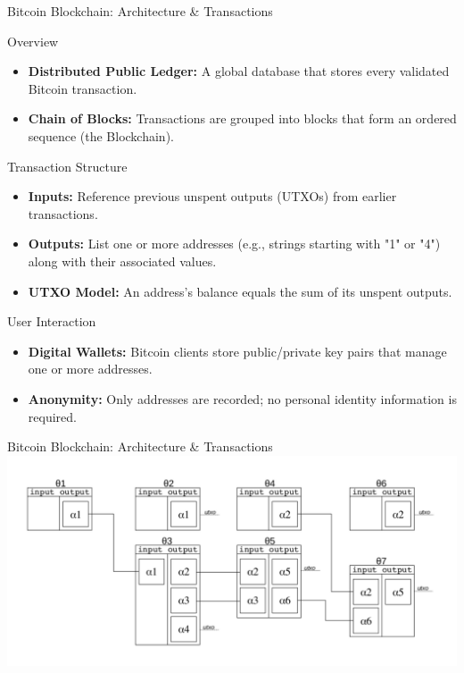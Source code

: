 \documentclass{beamer}
\begin{document}
\begin{frame}{Bitcoin Blockchain: Architecture \& Transactions}
    \footnotesize
    \vspace{-0.2cm}
    \begin{block}{Overview}
        \begin{itemize}
            \item \textbf{Distributed Public Ledger:} A global database that stores every validated Bitcoin transaction.
            \item \textbf{Chain of Blocks:} Transactions are grouped into blocks that form an ordered sequence (the Blockchain).
        \end{itemize}
    \end{block}

    \vspace{-0.2cm}
    \begin{block}{Transaction Structure}
        \begin{itemize}
            \item \textbf{Inputs:} Reference previous unspent outputs (UTXOs) from earlier transactions.
            \item \textbf{Outputs:} List one or more addresses (e.g., strings starting with "1" or "4") along with their associated values.
            \item \textbf{UTXO Model:} An address's balance equals the sum of its unspent outputs.
        \end{itemize}
    \end{block}

    \vspace{-0.2cm}
    \begin{block}{User Interaction}
        \begin{itemize}
            \item \textbf{Digital Wallets:} Bitcoin clients store public/private key pairs that manage one or more addresses.
            \item \textbf{Anonymity:} Only addresses are recorded; no personal identity information is required.
        \end{itemize}
    \end{block}
\end{frame}

\begin{frame}{Bitcoin Blockchain: Architecture \& Transactions}
    \centering
    \label{fig:ReteEsempio_1}
    \includegraphics[width=1\linewidth]{ReteEsempio_1}
\end{frame}
\end{document}
